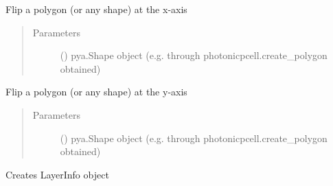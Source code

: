 \documentclass[a4paper,10pt,english]{sphinxmanual}
\begin{document}
\begin{fulllineitems}
\begin{fulllineitems}
\begin{quote}
\begin{description}
\end{description}\end{quote}

\end{fulllineitems}


\begin{fulllineitems}
\label{\detokenize{photonics:photonics.PhotDevice.flip_shape_xaxis}}
Flip a polygon (or any shape) at the x-axis
\begin{quote}\begin{description}
\item[{Parameters}] \leavevmode
{} () \textendash{} pya.Shape object (e.g. through photonicpcell.create\_polygon obtained)

\end{description}\end{quote}

\end{fulllineitems}


\begin{fulllineitems}
\label{\detokenize{photonics:photonics.PhotDevice.flip_shape_yaxis}}
Flip a polygon (or any shape) at the y-axis
\begin{quote}\begin{description}
\item[{Parameters}] \leavevmode
{} () \textendash{} pya.Shape object (e.g. through photonicpcell.create\_polygon obtained)

\end{description}\end{quote}

\end{fulllineitems}


\begin{fulllineitems}
\label{\detokenize{photonics:photonics.PhotDevice.get_layer}}
Creates LayerInfo object


\end{fulllineitems}
\end{fulllineitems}
\end{document}
